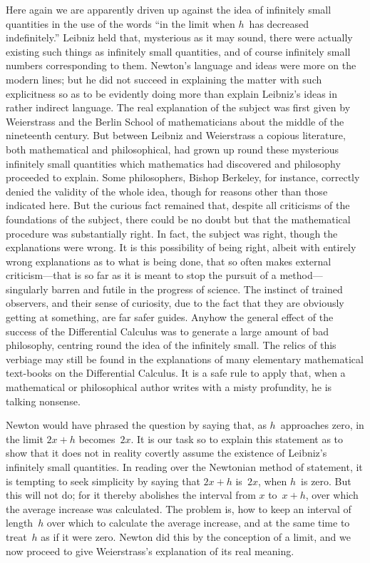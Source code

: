 \documentclass[12pt,leqno]{book}[2005/09/16]
\newcommand{\PageSep}[1]{\ignorespaces}
\begin{document}
Here again we are apparently driven up
against the idea of infinitely small quantities
in the use of the words ``in the limit when $h$~has
decreased indefinitely.'' Leibniz held that,
mysterious as it may sound, there were actually
existing such things as infinitely small
quantities, and of course infinitely small numbers
corresponding to them. Newton's language
and ideas were more on the modern
lines; but he did not succeed in explaining
the matter with such explicitness so as to be
evidently doing more than explain Leibniz's
ideas in rather indirect language. The real
explanation of the subject was first given by
Weierstrass and the Berlin School of mathematicians
%
about the middle of the nineteenth
century. But between Leibniz and Weierstrass
a copious literature, both mathematical
and philosophical, had grown up round these
mysterious infinitely small quantities which
mathematics had discovered and philosophy
proceeded to explain. Some philosophers,
%
Bishop Berkeley, for instance, correctly denied
the validity of the whole idea, though for
reasons other than those indicated here. But
the curious fact remained that, despite all
criticisms of the foundations of the subject,
there could be no doubt but that the mathematical
\PageSep{227}
procedure was substantially right. In
fact, the subject was right, though the explanations
were wrong. It is this possibility of
being right, albeit with entirely wrong explanations
as to what is being done, that so
often makes external criticism---that is so far
as it is meant to stop the pursuit of a method---singularly
barren and futile in the progress of
science. The instinct of trained observers,
and their sense of curiosity, due to the fact
that they are obviously getting at something,
are far safer guides. Anyhow the general
effect of the success of the Differential Calculus
was to generate a large amount of bad philosophy,
centring round the idea of the infinitely
small. The relics of this verbiage
may still be found in the explanations of
many elementary mathematical text-books on
the Differential Calculus. It is a safe rule to
apply that, when a mathematical or philosophical
author writes with a misty profundity,
he is talking nonsense.
\medskip

Newton would have phrased the question
%
by saying that, as $h$~approaches zero, in the
limit $2x + h$ becomes~$2x$. It is our task so to
explain this statement as to show that it does
not in reality covertly assume the existence
of Leibniz's infinitely small quantities. In
reading over the Newtonian method of statement,
it is tempting to seek simplicity by
\PageSep{228}
saying that $2x + h$ is~$2x$, when $h$~is zero. But
this will not do; for it thereby abolishes the
interval from $x$ to~$x + h$, over which the average
increase was calculated. The problem is, how
to keep an interval of length~$h$ over which to
calculate the average increase, and at the same
time to treat~$h$ as if it were zero. Newton did
this by the conception of a limit, and we now
%
proceed to give Weierstrass's explanation of
its real meaning.
\end{document}
